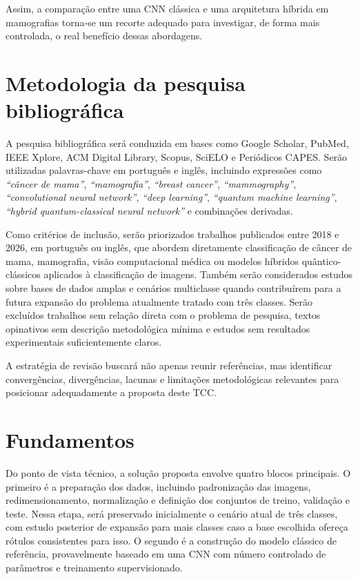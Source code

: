 \documentclass[
    12pt,
    openright,
    oneside,
    a4paper,
    english,
    brazil
]{abntex2}
\begin{document}
Assim, a comparação entre uma CNN clássica e uma arquitetura híbrida em mamografias torna-se um recorte adequado para investigar, de forma mais controlada, o real benefício dessas abordagens.

\section{Metodologia da pesquisa bibliográfica}
\label{sec:metodologia_biblio}

A pesquisa bibliográfica será conduzida em bases como Google Scholar, PubMed, IEEE Xplore, ACM Digital Library, Scopus, SciELO e Periódicos CAPES. Serão utilizadas palavras-chave em português e inglês, incluindo expressões como \textit{``câncer de mama''}, \textit{``mamografia''}, \textit{``breast cancer''}, \textit{``mammography''}, \textit{``convolutional neural network''}, \textit{``deep learning''}, \textit{``quantum machine learning''}, \textit{``hybrid quantum-classical neural network''} e combinações derivadas.

Como critérios de inclusão, serão priorizados trabalhos publicados entre 2018 e 2026, em português ou inglês, que abordem diretamente classificação de câncer de mama, mamografia, visão computacional médica ou modelos híbridos quântico-clássicos aplicados à classificação de imagens. Também serão considerados estudos sobre bases de dados amplas e cenários multiclasse quando contribuírem para a futura expansão do problema atualmente tratado com três classes. Serão excluídos trabalhos sem relação direta com o problema de pesquisa, textos opinativos sem descrição metodológica mínima e estudos sem resultados experimentais suficientemente claros.

A estratégia de revisão buscará não apenas reunir referências, mas identificar convergências, divergências, lacunas e limitações metodológicas relevantes para posicionar adequadamente a proposta deste TCC.

\section{Fundamentos}
\label{sec:fundamentos}

Do ponto de vista técnico, a solução proposta envolve quatro blocos principais. O primeiro é a preparação dos dados, incluindo padronização das imagens, redimensionamento, normalização e definição dos conjuntos de treino, validação e teste. Nessa etapa, será preservado inicialmente o cenário atual de três classes, com estudo posterior de expansão para mais classes caso a base escolhida ofereça rótulos consistentes para isso. O segundo é a construção do modelo clássico de referência, provavelmente baseado em uma CNN com número controlado de parâmetros e treinamento supervisionado.
\end{document}
